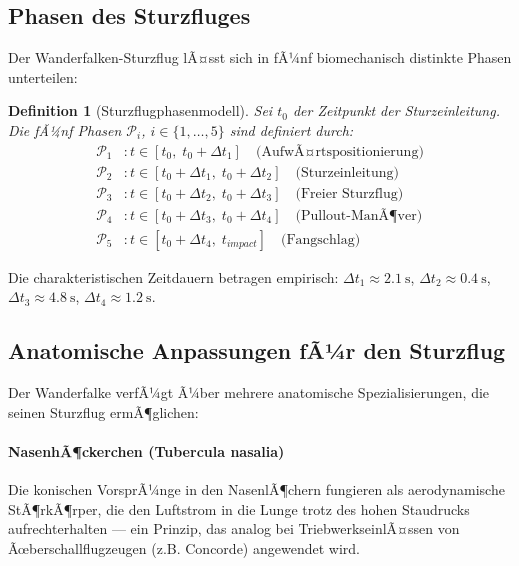 ﻿\documentclass[12pt,a4paper]{article}
\newtheorem{definition}{Definition}[section]
\theoremstyle{remark}
\begin{document}
	\subsection{Phasen des Sturzfluges}
	
	Der Wanderfalken-Sturzflug lÃ¤sst sich in fÃ¼nf biomechanisch distinkte Phasen unterteilen:
	
	\begin{definition}[Sturzflugphasenmodell]
		\label{def:phasen}
		Sei $t_0$ der Zeitpunkt der Sturzeinleitung. Die fÃ¼nf Phasen $\mathcal{P}_i$, $i \in \{1,\ldots,5\}$ sind definiert durch:
		\begin{align}
			\mathcal{P}_1 &: t \in [t_0,\; t_0 + \Delta t_1] \quad \text{(AufwÃ¤rtspositionierung)} \\
			\mathcal{P}_2 &: t \in [t_0 + \Delta t_1,\; t_0 + \Delta t_2] \quad \text{(Sturzeinleitung)} \\
			\mathcal{P}_3 &: t \in [t_0 + \Delta t_2,\; t_0 + \Delta t_3] \quad \text{(Freier Sturzflug)} \\
			\mathcal{P}_4 &: t \in [t_0 + \Delta t_3,\; t_0 + \Delta t_4] \quad \text{(Pullout-ManÃ¶ver)} \\
			\mathcal{P}_5 &: t \in [t_0 + \Delta t_4,\; t_{impact}] \quad \text{(Fangschlag)}
		\end{align}
	\end{definition}
	
	Die charakteristischen Zeitdauern betragen empirisch: $\Delta t_1 \approx \SI{2.1}{\s}$, $\Delta t_2 \approx \SI{0.4}{\s}$, $\Delta t_3 \approx \SI{4.8}{\s}$, $\Delta t_4 \approx \SI{1.2}{\s}$.
	
	\subsection{Anatomische Anpassungen fÃ¼r den Sturzflug}
	
	Der Wanderfalke verfÃ¼gt Ã¼ber mehrere anatomische Spezialisierungen, die seinen Sturzflug ermÃ¶glichen:
	
	\paragraph{NasenhÃ¶ckerchen (Tubercula nasalia)} Die konischen VorsprÃ¼nge in den NasenlÃ¶chern fungieren als aerodynamische StÃ¶rkÃ¶rper, die den Luftstrom in die Lunge trotz des hohen Staudrucks aufrechterhalten --- ein Prinzip, das analog bei TriebwerkseinlÃ¤ssen von Ãœberschallflugzeugen (z.B. Concorde) angewendet wird.
	
\end{document}
